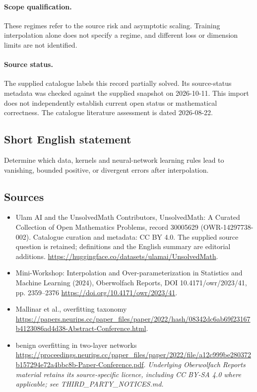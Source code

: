 \documentclass[11pt]{article}
\begin{document}
\paragraph{Scope qualification.}
These regimes refer to the source risk and asymptotic scaling. Training interpolation alone does not specify a regime, and different loss or dimension limits are not identified.
\paragraph{Source status.}
The supplied catalogue labels this record partially solved. Its source-status metadata was checked against the supplied snapshot on 2026-10-11. This import does not independently establish current open status or mathematical correctness. The catalogue literature assessment is dated 2026-08-22.
\subsection{Short English statement}
Determine which data, kernels and neural-network learning rules lead to vanishing, bounded positive, or divergent errors after interpolation.
\subsection{Sources}
\begin{itemize}
\item[S1] Ulam AI and the UnsolvedMath Contributors, UnsolvedMath: A Curated Collection of Open Mathematics Problems, record 30005629 (OWR-14297738-002). Catalogue curation and metadata: CC BY 4.0. The supplied source question is retained; definitions and the English summary are editorial additions.
\url{https://huggingface.co/datasets/ulamai/UnsolvedMath}.
\item[S2] Mini-Workshop: Interpolation and Over-parameterization in Statistics and Machine Learning​ (2024), Oberwolfach Reports, DOI 10.4171/owr/2023/41, pp. 2359--2376
\url{https://doi.org/10.4171/owr/2023/41}.
\item[S3] Mallinar et al., overfitting taxonomy
\url{https://papers.neurips.cc/paper_files/paper/2022/hash/08342dc6ab69f23167b4123086ad4d38-Abstract-Conference.html}.
\item[S4] benign overfitting in two-layer networks
\url{https://proceedings.neurips.cc/paper_files/paper/2022/file/a12c999be280372b157294e72a4bbc8b-Paper-Conference.pdf}.
\textit{Underlying Oberwolfach Reports material retains its source-specific licence, including CC BY-SA 4.0 where applicable; see THIRD\_PARTY\_NOTICES.md.}
\end{itemize}
\end{document}
